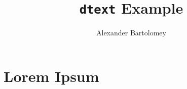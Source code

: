 \documentclass{dtext}
\title{\texttt{dtext} Example}
\author{Alexander Bartolomey}
\begin{document}
\maketitle
\section{Lorem Ipsum}
\lipsum[1-7]
\end{document}
